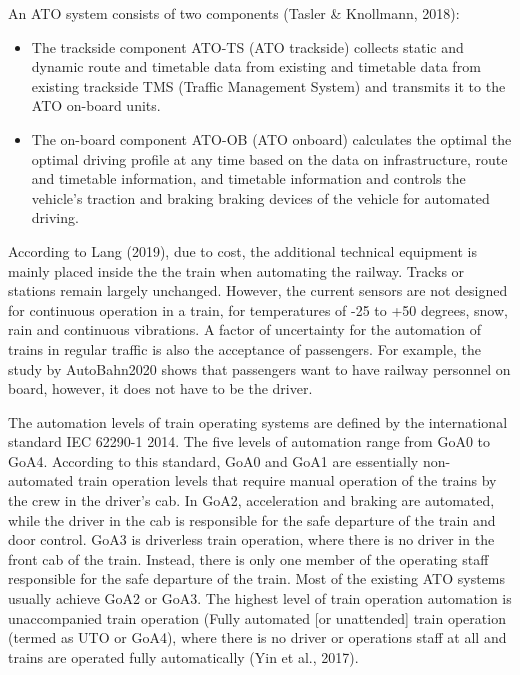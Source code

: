\documentclass[
]{book}
\providecommand{\tightlist}{%
  \setlength{\itemsep}{0pt}\setlength{\parskip}{0pt}}
\begin{document}
An ATO system consists of two components (Tasler \& Knollmann, 2018):

\begin{itemize}
\tightlist
\item
  The trackside component ATO-TS (ATO trackside) collects static and dynamic route and timetable data from existing and timetable data from existing trackside TMS (Traffic Management System) and transmits it to the ATO on-board units.
\item
  The on-board component ATO-OB (ATO onboard) calculates the optimal the optimal driving profile at any time based on the data on infrastructure, route and timetable information, and timetable information and controls the vehicle's traction and braking braking devices of the vehicle for automated driving.
\end{itemize}

According to Lang (2019), due to cost, the additional technical equipment is mainly placed inside the the train when automating the railway. Tracks or stations remain largely unchanged. However, the current sensors are not designed for continuous operation in a train, for temperatures of -25 to +50 degrees, snow, rain and continuous vibrations. A factor of uncertainty for the automation of trains in regular traffic is also the acceptance of passengers. For example, the study by AutoBahn2020 shows that passengers want to have railway personnel on board, however, it does not have to be the driver.

The automation levels of train operating systems are defined by the international standard IEC 62290-1 2014. The five levels of automation range from GoA0 to GoA4. According to this standard, GoA0 and GoA1 are essentially non-automated train operation levels that require manual operation of the trains by the crew in the driver's cab. In GoA2, acceleration and braking are automated, while the driver in the cab is responsible for the safe departure of the train and door control. GoA3 is driverless train operation, where there is no driver in the front cab of the train. Instead, there is only one member of the operating staff responsible for the safe departure of the train. Most of the existing ATO systems usually achieve GoA2 or GoA3. The highest level of train operation automation is unaccompanied train operation (Fully automated {[}or unattended{]} train operation (termed as UTO or GoA4), where there is no driver or operations staff at all and trains are operated fully automatically (Yin et al., 2017).
\end{document}

